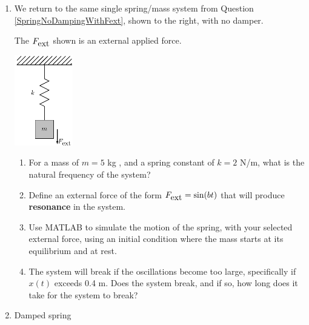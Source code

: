 \begin{enumerate}
\item 
  \begin{Question}
    \begin{minipage}[t]{0.6\linewidth}
      \vspace{0pt}
      We return to the same single spring/mass system from Question \ref{SpringNoDampingWithFext}, shown to the right, with no damper.
      
The $F_{\mbox{ext}}$ shown is an external applied force.
    \end{minipage}
    \begin{minipage}[t]{0.3\linewidth}
\vspace{0pt}
\begin{center}
\includegraphics[width=1.0in]{graphics/Week08_Spring/SpringNoDampingWithFext}
\end{center}
    \end{minipage}


\begin{enumerate}
\item For a mass of $m = 5$ kg , and a spring constant of $k = 2$ N/m,
  what is the natural frequency of the system?
\item Define an external force of the form $F_{\mbox{ext}} = \sin(b t)$ that will
produce {\bf resonance} in the system.
\item Use MATLAB to simulate the motion of the spring, with your
  selected external force, using an initial condition where the mass
  starts at its equilibrium and at rest.
\item The system will break if the oscillations become too large,
  specifically if $x(t)$ exceeds 0.4 m.  Does the system break, and if
  so, how long does it take for the system to break?
\end{enumerate}
\end{Question}

\begin{Solution}
  
\end{Solution}


\item 
  \begin{Question}
    \begin{minipage}[t]{0.6\linewidth}
      \vspace{0pt}
Damped spring


\end{minipage}
\end{Question}
\end{enumerate}
